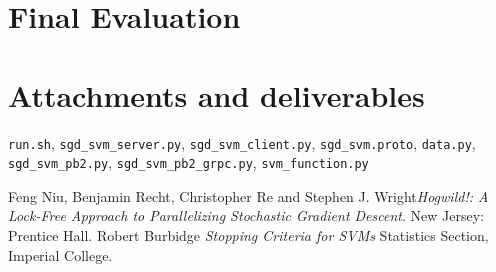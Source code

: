 \documentclass[a4paper, 11pt]{article}
\begin{document}
\section*{Final Evaluation}


\section*{Attachments and deliverables}
\texttt{run.sh}, 
\texttt{sgd\_svm\_server.py}, 
\texttt{sgd\_svm\_client.py}, 
\texttt{sgd\_svm.proto}, 
\texttt{data.py}, 
\texttt{sgd\_svm\_pb2.py}, 
\texttt{sgd\_svm\_pb2\_grpc.py}, 
\texttt{svm\_function.py}

\begin{thebibliography}{9}
 Feng Niu, Benjamin Recht, Christopher Re and Stephen J. Wright\emph{Hogwild!: A Lock-Free Approach to Parallelizing Stochastic Gradient Descent}. New Jersey: Prentice Hall.
 Robert Burbidge \emph{Stopping Criteria for SVMs} Statistics Section, Imperial College.
\end{thebibliography}
\end{document}
